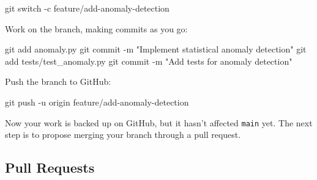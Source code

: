 \documentclass[
  letterpaper,
  DIV=11,
  numbers=noendperiod]{scrreprt}
\newenvironment{Shaded}{\begin{snugshade}}{\end{snugshade}}
\newcommand{\AttributeTok}[1]{\textcolor[rgb]{0.40,0.45,0.13}{#1}}
\newcommand{\FunctionTok}[1]{\textcolor[rgb]{0.28,0.35,0.67}{#1}}
\newcommand{\NormalTok}[1]{\textcolor[rgb]{0.00,0.23,0.31}{#1}}
\newcommand{\StringTok}[1]{\textcolor[rgb]{0.13,0.47,0.30}{#1}}
\begin{document}
\begin{codelisting}

\caption{\texttt{terminal}}

\begin{Shaded}
\begin{Highlighting}[]
\FunctionTok{git}\NormalTok{ switch }\AttributeTok{{-}c}\NormalTok{ feature/add{-}anomaly{-}detection}
\end{Highlighting}
\end{Shaded}

\end{codelisting}

Work on the branch, making commits as you go:

\begin{codelisting}

\caption{\texttt{terminal}}

\begin{Shaded}
\begin{Highlighting}[]
\FunctionTok{git}\NormalTok{ add anomaly.py}
\FunctionTok{git}\NormalTok{ commit }\AttributeTok{{-}m} \StringTok{"Implement statistical anomaly detection"}
\FunctionTok{git}\NormalTok{ add tests/test\_anomaly.py}
\FunctionTok{git}\NormalTok{ commit }\AttributeTok{{-}m} \StringTok{"Add tests for anomaly detection"}
\end{Highlighting}
\end{Shaded}

\end{codelisting}

Push the branch to GitHub:

\begin{codelisting}

\caption{\texttt{terminal}}

\begin{Shaded}
\begin{Highlighting}[]
\FunctionTok{git}\NormalTok{ push }\AttributeTok{{-}u}\NormalTok{ origin feature/add{-}anomaly{-}detection}
\end{Highlighting}
\end{Shaded}

\end{codelisting}

Now your work is backed up on GitHub, but it hasn't affected
\texttt{main} yet. The next step is to propose merging your branch
through a pull request.

\subsection{Pull Requests}\label{pull-requests}
\end{document}
